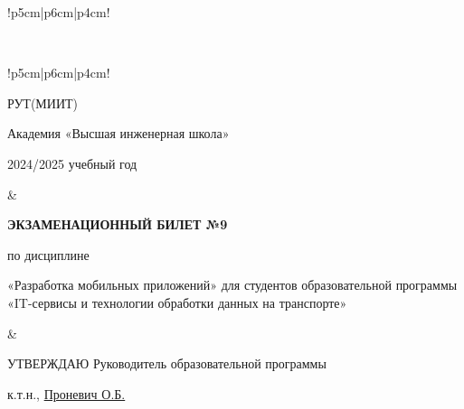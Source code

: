 \documentclass[a4paper]{article}
\begin{document}
\begin{tabular}{!{\vrule width 2pt}p{5cm}|p{6cm}|p{4cm}!{\vrule width 2pt}}
{\begin{minipage}{16cm}
\vspace{0.2cm}
    
\end{minipage}
}
\\
\end{tabular}

\newpage


\begin{tabular}{!{\vrule width 2pt}p{5cm}|p{6cm}|p{4cm}!{\vrule width 2pt}}

    {\centering 
    \fontsize{14pt}{16pt}\selectfont
    РУТ(МИИТ)

\vspace{14pt}

Академия «Высшая инженерная школа»

\vspace{14pt}

2024/2025 учебный год

    }
&
{
    \centering
\fontsize{14pt}{16pt}\selectfont

\textbf{ЭКЗАМЕНАЦИОННЫЙ
БИЛЕТ №9}


по дисциплине 

«Разработка мобильных приложений» 
\fontsize{12pt}{14pt}\selectfont
для студентов образовательной программы «IT-сервисы и технологии обработки данных на транспорте»

}
&
{
\centering
\fontsize{14pt}{16pt}\selectfont

УТВЕРЖДАЮ
Руководитель образовательной программы

\vspace{1cm}

\fontsize{12pt}{14pt}\selectfont
\underline{\hspace{3cm}}

к.т.н., \underline{Проневич О.Б.}

}
\\
\hline
{}
\end{tabular}
\end{document}
